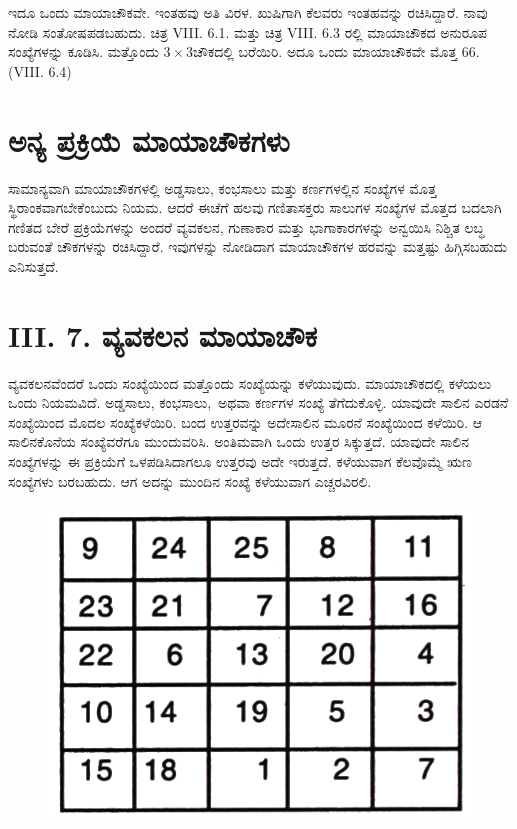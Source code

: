 ಇದೂ ಒಂದು ಮಾಯಾಚೌಕವೇ. ಇಂತಹವು ಅತಿ ವಿರಳ. ಖುಷಿಗಾಗಿ ಕೆಲವರು ಇಂತಹ\-ವನ್ನು ರಚಿಸಿದ್ದಾರೆ. ನಾವು ನೋಡಿ ಸಂತೋಷಪಡಬಹುದು. ಚಿತ್ರ VIII. 6.1. ಮತ್ತು ಚಿತ್ರ VIII. 6.3 ರಲ್ಲಿ ಮಾಯಾಚೌಕದ ಅನುರೂಪ ಸಂಖ್ಯೆಗಳನ್ನು ಕೂಡಿಸಿ. ಮತ್ತೊಂದು $3 \times 3$ಚೌಕದಲ್ಲಿ ಬರೆಯಿರಿ. ಅದೂ ಒಂದು ಮಾಯಾಚೌಕವೇ ಮೊತ್ತ 66. (VIII. 6.4)

\section*{ಅನ್ಯ ಪ್ರಕ್ರಿಯೆ ಮಾಯಾಚೌಕಗಳು}

ಸಾಮಾನ್ಯವಾಗಿ ಮಾಯಾಚೌಕಗಳಲ್ಲಿ ಅಡ್ಡಸಾಲು, ಕಂಭಸಾಲು ಮತ್ತು ಕರ್ಣಗಳಲ್ಲಿನ ಸಂಖ್ಯೆಗಳ ಮೊತ್ತ ಸ್ಥಿರಾಂಕವಾಗಬೇಕೆಂಬುದು ನಿಯಮ. ಆದರೆ ಈಚೆಗೆ ಹಲವು ಗಣಿತಾಸಕ್ತರು ಸಾಲು\-ಗಳ ಸಂಖ್ಯೆಗಳ ಮೊತ್ತದ ಬದಲಾಗಿ ಗಣಿತದ ಬೇರೆ ಪ್ರಕ್ರಿಯೆಗಳನ್ನು ಅಂದರೆ ವ್ಯವಕಲನ, ಗುಣಾ\-ಕಾರ ಮತ್ತು ಭಾಗಾಕಾರಗಳನ್ನು ಅನ್ವಯಿಸಿ ನಿಶ್ಚಿತ ಲಬ್ಧ ಬರುವಂತೆ ಚೌಕಗಳನ್ನು ರಚಿಸಿ\-ದ್ದಾರೆ. ಇವುಗಳನ್ನು ನೋಡಿದಾಗ ಮಾಯಾಚೌಕಗಳ ಹರವನ್ನು ಮತ್ತಷ್ಟು ಹಿಗ್ಗಿಸಬಹುದು \break ಎನಿಸುತ್ತದೆ.

\section*{ III. 7. ವ್ಯವಕಲನ ಮಾಯಾಚೌಕ}

ವ್ಯವಕಲನವೆಂದರೆ ಒಂದು ಸಂಖ್ಯೆಯಿಂದ ಮತ್ತೊಂದು ಸಂಖ್ಯೆಯನ್ನು ಕಳೆಯುವುದು. \hbox{ಮಾಯಾಚೌಕದಲ್ಲಿ} ಕಳೆಯಲು ಒಂದು ನಿಯಮವಿದೆ. ಅಡ್ಡಸಾಲು, \hbox{ಕಂಭಸಾಲು, ಅಥವಾ} ಕರ್ಣಗಳ ಸಂಖ್ಯೆ ತೆಗೆದುಕೊಳ್ಳಿ. ಯಾವುದೇ ಸಾಲಿನ ಎರಡನೆ ಸಂಖ್ಯೆಯಿಂದ ಮೊದಲ ಸಂಖ್ಯೆ\-ಕಳೆಯಿರಿ. ಬಂದ ಉತ್ತರವನ್ನು ಅದೇಸಾಲಿನ ಮೂರನೆ ಸಂಖ್ಯೆಯಿಂದ ಕಳೆಯಿರಿ. ಆ ಸಾಲಿನ\-ಕೊನೆಯ ಸಂಖ್ಯೆವರೆಗೂ ಮುಂದುವರಿಸಿ. ಅಂತಿಮವಾಗಿ ಒಂದು ಉತ್ತರ ಸಿಕ್ಕುತ್ತದೆ.  \linebreak ಯಾವುದೇ ಸಾಲಿನ ಸಂಖ್ಯೆಗಳನ್ನು ಈ ಪ್ರಕ್ರಿಯೆಗೆ ಒಳಪಡಿಸಿದಾಗಲೂ ಉತ್ತರವು ಅದೇ ಇರುತ್ತದೆ. ಕಳೆಯುವಾಗ ಕೆಲವೊಮ್ಮೆ ಋಣ ಸಂಖ್ಯೆಗಳು ಬರಬಹುದು. ಆಗ ಅದನ್ನು ಮುಂದಿನ ಸಂಖ್ಯೆ ಕಳೆಯುವಾಗ ಎಚ್ಚರವಿರಲಿ.
\begin{figure}[H]
\includegraphics{src/figures/chap7/fig7-24.jpg}
\end{figure}

